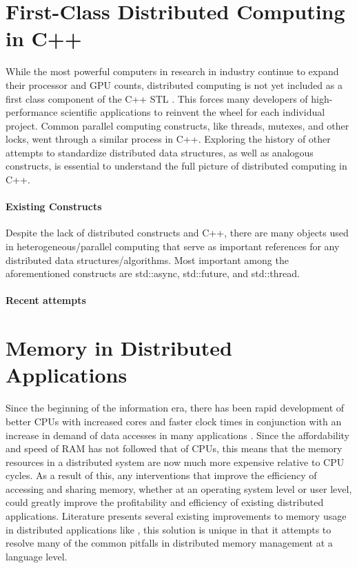 \section{First-Class Distributed Computing in C++}
While the most powerful computers in research in industry continue to expand their processor and GPU counts,
distributed computing is not yet included as a first class component of the C++ STL \cite{towards_dist_cpp}. This forces many developers of high-performance scientific applications to reinvent the wheel for each individual project.  Common parallel computing constructs, like threads, mutexes, and other locks, went through a similar process in C++. Exploring the history of other attempts to standardize distributed data structures, as well as analogous constructs, is essential to understand the full picture of distributed computing in C++. 

\paragraph{Existing Constructs}
Despite the lack of distributed constructs and C++, there are many objects used in heterogeneous/parallel computing that serve as important references for any distributed data structures/algorithms. Most important among the aforementioned constructs are std::async, std::future, and std::thread. \cite{async_cpp}  

\paragraph{Recent attempts}

\section{Memory in Distributed Applications}
Since the beginning of the information era, there has been rapid development of better CPUs with increased cores and faster clock times in conjunction with an increase in demand of data accesses in many applications \cite{sharing_cpu_memory}. Since the affordability and speed of RAM has not followed that of CPUs, this means that the memory resources in a distributed system are now much more expensive relative to CPU cycles. As a result of this, any interventions that improve the efficiency of accessing and sharing memory, whether at an operating system level or user level, could greatly improve the profitability and efficiency of existing distributed applications. Literature presents several existing improvements to memory usage in distributed applications like \cite{virtual_memory_tlb} \cite{sharing_cpu_memory}, this solution is unique in that it attempts to resolve many of the common pitfalls in distributed memory management at a language level. 
